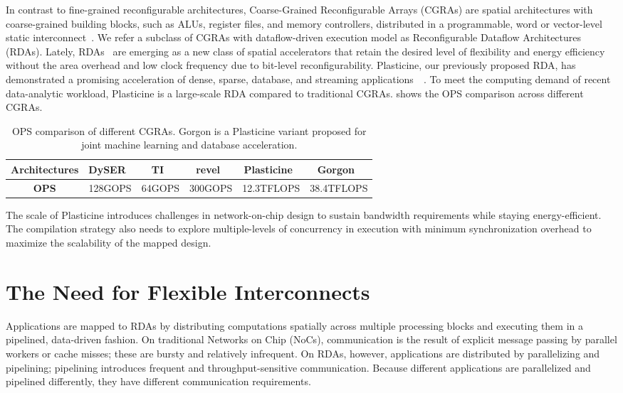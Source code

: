 In contrast to fine-grained reconfigurable architectures,
Coarse-Grained Reconfigurable Arrays (CGRAs) are spatial architectures with 
coarse-grained building blocks, such as ALUs, register files, and memory controllers, 
distributed in a programmable, word or vector-level static interconnect~\cite{adres, kress, dyser, piperench, tartan, 
hrl, hycube}.
We refer a subclass of CGRAs with dataflow-driven execution model as Reconfigurable Dataflow
Architectures (RDAs).
Lately, RDAs~\cite{plasticine, ti, streamdataflow,neuflow,cnndataflow,dataflowarch} are emerging as a new class of spatial accelerators that retain the desired level of flexibility and energy efficiency without the area overhead and low clock frequency due to bit-level reconfigurability.
Plasticine, our previously proposed RDA, 
has demonstrated a promising acceleration of dense, sparse, database, and streaming applications~~\cite{plasticine, gorgon, multijoin,prabhakarthesis}.
To meet the computing demand of recent data-analytic workload, Plasticine is a large-scale RDA
compared to traditional CGRAs. 
 shows the OPS comparison across different CGRAs.

\begin{table}
  \centering
\begin{tabular*}{0.88\textwidth}{cccccc}
  \toprule
  \textbf{Architectures} & DySER~\cite{dyser} & TI~\cite{ti} & revel~\cite{revel}
  & Plasticine~\cite{plasticine} & Gorgon~\cite{gorgon}\\\midrule
  \textbf{OPS} & 128GOPS & 64GOPS & 300GOPS & 12.3TFLOPS & 38.4TFLOPS \\
  \bottomrule
\end{tabular*}
\caption[OPS comparison of different CGRAs]{OPS comparison of different CGRAs. Gorgon is a
Plasticine variant proposed for joint machine learning and database acceleration.}
\label{tab:ops}
\end{table}

The scale of Plasticine introduces challenges in network-on-chip design to sustain 
bandwidth requirements while staying energy-efficient.
The compilation strategy also needs to explore multiple-levels of concurrency in execution with minimum synchronization overhead to maximize the scalability of the mapped design.

\section{The Need for Flexible Interconnects}
Applications are mapped to RDAs by distributing computations spatially across multiple processing blocks and executing them in a pipelined, data-driven fashion. On traditional Networks on Chip (NoCs), communication is the result of explicit message passing by parallel workers or cache misses; these are bursty and
relatively infrequent. On RDAs, however, applications are distributed by parallelizing and pipelining; 
pipelining introduces frequent and throughput-sensitive communication. Because different applications are parallelized and pipelined differently, they have different communication requirements.

